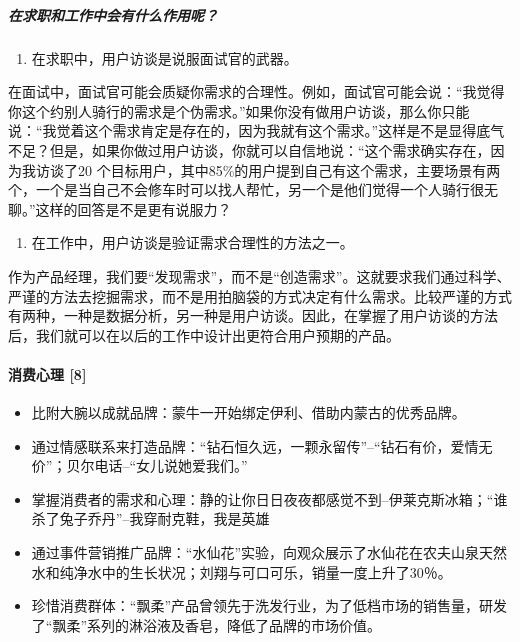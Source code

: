 \documentclass[letterpaper,11pt,english]{sphinxmanual}
\begin{document}
\subparagraph{在求职和工作中会有什么作用呢？}
\label{\detokenize{chapter_knowledge/users_analysis:id33}}\begin{enumerate}
%
\item {} 
在求职中，用户访谈是说服面试官的武器。

\end{enumerate}

在面试中，面试官可能会质疑你需求的合理性。例如，面试官可能会说：“我觉得你这个约别人骑行的需求是个伪需求。”如果你没有做用户访谈，那么你只能说：“我觉着这个需求肯定是存在的，因为我就有这个需求。”这样是不是显得底气不足？但是，如果你做过用户访谈，你就可以自信地说：“这个需求确实存在，因为我访谈了20
个目标用户，其中85\%的用户提到自己有这个需求，主要场景有两个，一个是当自己不会修车时可以找人帮忙，另一个是他们觉得一个人骑行很无聊。”这样的回答是不是更有说服力？
\begin{enumerate}
%
\setcounter{enumi}{1}
\item {} 
在工作中，用户访谈是验证需求合理性的方法之一。

\end{enumerate}

作为产品经理，我们要“发现需求”，而不是“创造需求”。这就要求我们通过科学、严谨的方法去挖掘需求，而不是用拍脑袋的方式决定有什么需求。比较严谨的方式有两种，一种是数据分析，另一种是用户访谈。因此，在掌握了用户访谈的方法后，我们就可以在以后的工作中设计出更符合用户预期的产品。


\paragraph{消费心理 {[}8{]}}
\label{\detokenize{chapter_knowledge/users_analysis:id34}}\begin{itemize}
\item {} 
比附大腕以成就品牌：蒙牛一开始绑定伊利、借助内蒙古的优秀品牌。

\item {} 
通过情感联系来打造品牌：“钻石恒久远，一颗永留传”–“钻石有价，爱情无价”；贝尔电话–“女儿说她爱我们。”

\item {} 
掌握消费者的需求和心理：静的让你日日夜夜都感觉不到–伊莱克斯冰箱；“谁杀了兔子乔丹”–我穿耐克鞋，我是英雄

\item {} 
通过事件营销推广品牌：“水仙花”实验，向观众展示了水仙花在农夫山泉天然水和纯净水中的生长状况；刘翔与可口可乐，销量一度上升了30％。

\item {} 
珍惜消费群体：“飘柔”产品曾领先于洗发行业，为了低档市场的销售量，研发了“飘柔”系列的淋浴液及香皂，降低了品牌的市场价值。

\end{itemize}
\end{document}
